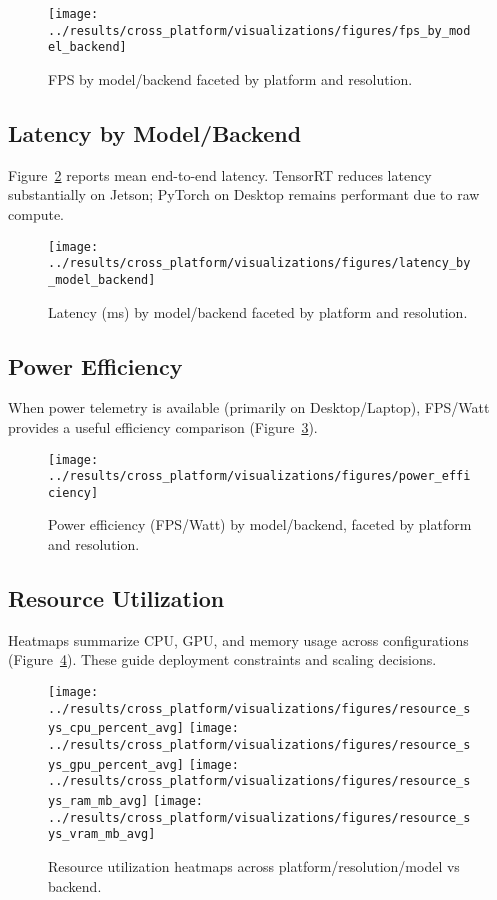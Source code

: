 \documentclass[11pt,a4paper]{article}
\begin{document}
\begin{figure}[h]
  \centering
  \texttt{[image: ../results/cross\_platform/visualizations/figures/fps\_by\_model\_backend]}
  \caption{FPS by model/backend faceted by platform and resolution.}
  \label{fig:fps}
\end{figure}

\subsection{Latency by Model/Backend}
Figure~\ref{fig:latency} reports mean end-to-end latency. TensorRT reduces latency substantially on Jetson; PyTorch on Desktop remains performant due to raw compute.

\begin{figure}[h]
  \centering
  \texttt{[image: ../results/cross\_platform/visualizations/figures/latency\_by\_model\_backend]}
  \caption{Latency (ms) by model/backend faceted by platform and resolution.}
  \label{fig:latency}
\end{figure}

\subsection{Power Efficiency}
When power telemetry is available (primarily on Desktop/Laptop), FPS/Watt provides a useful efficiency comparison (Figure~\ref{fig:power}).

\begin{figure}[h]
  \centering
  \texttt{[image: ../results/cross\_platform/visualizations/figures/power\_efficiency]}
  \caption{Power efficiency (FPS/Watt) by model/backend, faceted by platform and resolution.}
  \label{fig:power}
\end{figure}

\subsection{Resource Utilization}
Heatmaps summarize CPU, GPU, and memory usage across configurations (Figure~\ref{fig:resource}). These guide deployment constraints and scaling decisions.

\begin{figure}[h]
  \centering
  \texttt{[image: ../results/cross\_platform/visualizations/figures/resource\_sys\_cpu\_percent\_avg]}
  \texttt{[image: ../results/cross\_platform/visualizations/figures/resource\_sys\_gpu\_percent\_avg]}
  \texttt{[image: ../results/cross\_platform/visualizations/figures/resource\_sys\_ram\_mb\_avg]}
  \texttt{[image: ../results/cross\_platform/visualizations/figures/resource\_sys\_vram\_mb\_avg]}
  \caption{Resource utilization heatmaps across platform/resolution/model vs backend.}
  \label{fig:resource}
\end{figure}
\end{document}
